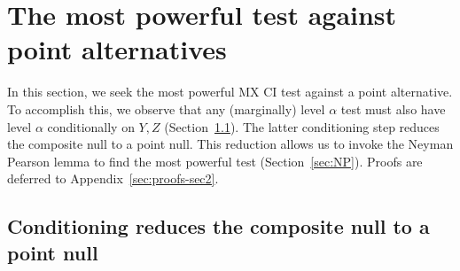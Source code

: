 \documentclass[12pt]{article}
\theoremstyle{definition}
\theoremstyle{remark}
\newcommand{\srx}{X}
\newcommand{\srz}{Z}
\newcommand{\srxk}{\widetilde X}
\newcommand{\sry}{Y}
\begin{document}
%



\section{The most powerful test against point alternatives} \label{sec:power}

In this section, we seek the most powerful MX CI test against a point alternative. To accomplish this, we observe that any (marginally) level $\alpha$ test must also have level $\alpha$ conditionally on $\sry, \srz$ (Section~\ref{sec:reduction-by-conditioning}). The latter conditioning step reduces the composite null to a point null. This reduction allows us to invoke the Neyman Pearson lemma to find the most powerful test  (Section~\ref{sec:NP}). Proofs are deferred to Appendix~\ref{sec:proofs-sec2}.

\subsection{Conditioning reduces the composite null to a point null} \label{sec:reduction-by-conditioning}
\end{document}
